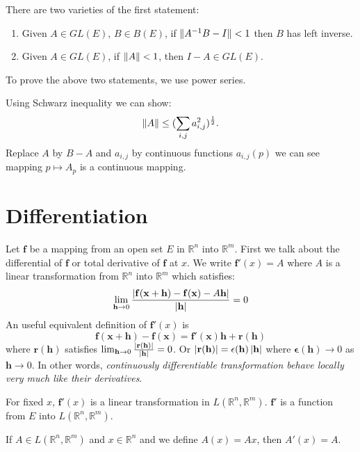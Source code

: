 There are two varieties of the first statement:
\begin{enumerate}
    \item Given $A\in GL(E)$, $B\in B(E)$, if $\lVert A^{-1}B-I\rVert<1$ then $B$ has left inverse.
    \item Given $A\in GL(E)$, if $\lVert A\rVert<1$, then $I-A\in GL(E)$.
\end{enumerate}
To prove the above two statements, we use power series.\par
Using Schwarz inequality we can show:
\begin{equation*}
    \lVert A\rVert\leq (\sum_{i,j}a_{i,j}^2)^{\frac{1}{2}}.
\end{equation*}
Replace $A$ by $B-A$ and $a_{i,j}$ by continuous functions $a_{i,j}(p)$ we can see mapping $p\mapsto A_p$ is a continuous mapping.
\section{Differentiation}
Let $\mathbf{f}$ be a mapping from an open set $E$ in $\mathbb{R}^n$ into $\mathbb{R}^m$. First we talk about the differential of $\mathbf{f}$ or total derivative of $\mathbf{f}$ at $x$. We write $\mathbf{f}'(x)=A$ where $A$ is a linear transformation from $\mathbb{R}^n$ into $\mathbb{R}^m$ which satisfies:
\begin{equation*}
\lim_{\mathbf{h}\to 0}\frac{\left\lvert\mathbf{f}(\mathbf{x}+\mathbf{h})-\mathbf{f}(\mathbf{x})-A\mathbf{h}\right\rvert}{\left\lvert\mathbf{h}\right\rvert}=0
\end{equation*}
An useful equivalent definition of $\mathbf{f}'(x)$ is 
\begin{equation*}
    \mathbf{f}(\mathbf{x}+\mathbf{h})-\mathbf{f}(\mathbf{x})=\mathbf{f}'(\mathbf{x})\mathbf{h}+\mathbf{r}(\mathbf{h})
\end{equation*}
where $\mathbf{r}(\mathbf{h})$ satisfies $\lim_{\mathbf{h}\to 0}\frac{\left\lvert\mathbf{r}(\mathbf{h})\right\rvert}{\left\lvert\mathbf{h}\right\rvert}=0$. Or $\left\lvert\mathbf{r}(\mathbf{h})\right\rvert=\mathbf{\epsilon}(\mathbf{h})\left\lvert\mathbf{h}\right\rvert$ where $\mathbf{\epsilon}(\mathbf{h})\to 0$ as $\mathbf{h}\to 0$. In other words, \emph{continuously differentiable transformation behave locally very much like their derivatives}.\par
For fixed $x$, $\mathbf{f}'(x)$ is a linear transformation in $L(\mathbb{R}^n,\mathbb{R}^m)$. $\mathbf{f}'$ is a function from $E$ into $L(\mathbb{R}^n,\mathbb{R}^m)$.\par
If $A\in L(\mathbb{R}^n,\mathbb{R}^m)$ and $x\in \mathbb{R}^n$ and we define $A(x)=Ax$, then $A'(x)=A$.\par
